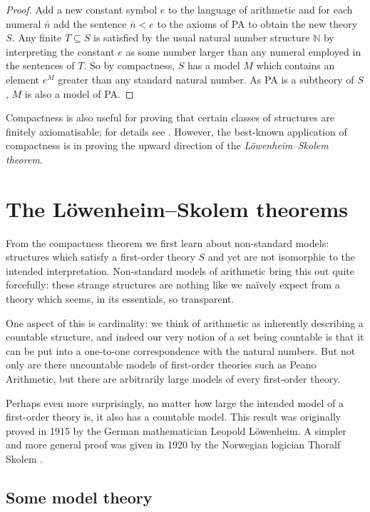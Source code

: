 \documentclass[10pt, a4paper, oneside]{article}
\theoremstyle{definition}
\theoremstyle{remark}
\theoremstyle{plain}
\theoremstyle{plain}
\begin{document}
\begin{proof}
    Add a new constant symbol $e$ to the language of arithmetic and for each
    numeral $\bar{n}$ add the sentence $\bar{n} < e$ to the axioms of PA to
    obtain the new theory $S$. Any finite $T \subseteq S$ is satisfied by the
    usual natural number structure $\mathbb{N}$ by interpreting the constant $e$
    as some number larger than any numeral employed in the sentences of $T$. So
    by compactness, $S$ has a model $M$ which contains an element $e^M$ greater
    than any standard natural number. As PA is a subtheory of $S$, $M$ is also a
    model of PA.
\end{proof}

Compactness is also useful for proving that certain classes of structures are
finitely axiomatisable; for details see \citet[pp. 114--116]{vdalen2004}.
However, the best-known application of compactness is in proving the upward
direction of the \emph{Löwenheim--Skolem theorem}.

\section{The Löwenheim--Skolem theorems}

From the compactness theorem we first learn about non-standard models:
structures which satisfy a first-order theory $S$ and yet are not isomorphic to
the intended interpretation. Non-standard models of arithmetic bring this out
quite forcefully: these strange structures are nothing like we naïvely expect
from a theory which seems, in its essentials, so transparent.

One aspect of this is cardinality: we think of arithmetic as inherently
describing a countable structure, and indeed our very notion of a set being
countable is that it can be put into a one-to-one correspondence with the
natural numbers. But not only are there uncountable models of first-order
theories such as Peano Arithmetic, but there are arbitrarily large models of
every first-order theory.

Perhaps even more surprisingly, no matter how large the intended model of a
first-order theory is, it also has a countable model. This result was originally
proved in 1915 by the German mathematician Leopold Löwenheim. A simpler and more
general proof was given in 1920 by the Norwegian logician Thoralf Skolem
\citep{lowenheim1915, skolem1920}.

\subsection{Some model theory}
\end{document}
